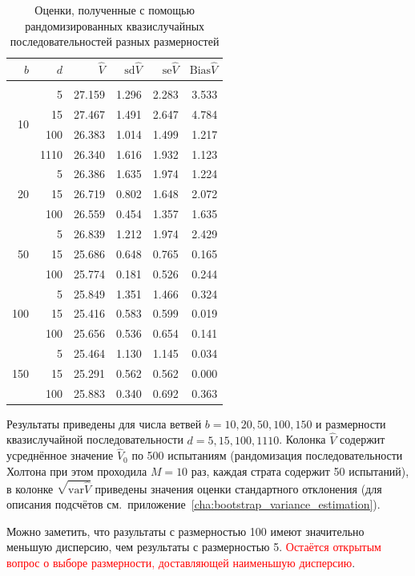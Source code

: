 \documentclass[specialist,
               substylefile = ../spbu.rtx,
               subf,href,colorlinks=true, 12pt]{disser}
\newcommand{\Vhat}{\hat{V}}
\begin{document}
\begin{table}
	\renewcommand{\arraystretch}{0.6}
	\centering
	\caption{Оценки, полученные с помощью рандомизированных квазислучайных последовательностей разных размерностей}
	\begin{tabular}{rrrrrr}
		$b$&$d$&$\Vhat$&$\mathrm{sd}\Vhat$&$\mathrm{se}\Vhat$&$\mathrm{Bias}\Vhat$\\[5pt]\hline\\[-5pt]
		\multirow{4}{*}{10}&5&27.159&1.296&2.283&3.533\\
		&15&27.467&1.491&2.647&4.784\\
		&100&26.383&1.014&1.499&1.217\\
		&1110&26.340&1.616&1.932&1.123\\[5pt]
		&5&26.386&1.635&1.974&1.224\\
		20&15&26.719&0.802&1.648&2.072\\
		&100&26.559&0.454&1.357&1.635\\[5pt]
		&5&26.839&1.212&1.974&2.429\\
		50&15&25.686&0.648&0.765&0.165\\
		&100&25.774&0.181&0.526&0.244\\[5pt]
		&5&25.849&1.351&1.466&0.324\\
		100&15&25.416&0.583&0.599&0.019\\
		&100&25.656&0.536&0.654&0.141\\[5pt]
		&5&25.464&1.130&1.145&0.034\\
		150&15&25.291&0.562&0.562&0.000\\
		&100&25.883&0.340&0.692&0.363\\[10pt]
	\end{tabular}
	\label{tbl:halton_estimators}

	\footnotesize
	Результаты приведены для числа ветвей $b = 10, 20, 50, 100, 150$ и размерности квазислучайной последовательности $d = 5, 15, 100, 1110$. Колонка $\Vhat$ содержит усреднённое значение $\Vhat_0$ по 500 испытаниям (рандомизация последовательности Холтона при этом проходила $M = 10$ раз, каждая страта содержит 50 испытаний), в колонке $\sqrt{\mathrm{var} \Vhat}$ приведены значения оценки стандартного отклонения (для описания подсчётов см.~приложение~\ref{cha:bootstrap_variance_estimation}).
\end{table}

Можно заметить, что разультаты с размерностью 100 имеют значительно меньшую дисперсию, чем результаты с размерностью 5. \textcolor{red}{Остаётся открытым вопрос о выборе размерности, доставляющей наименьшую дисперсию}.
\end{document}
